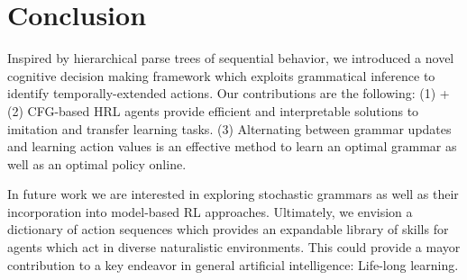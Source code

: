 \documentclass[10pt,letterpaper]{article}
\begin{document}
\section{Conclusion}

Inspired by hierarchical parse trees of sequential behavior, we introduced a novel cognitive decision making framework which exploits grammatical inference to identify temporally-extended actions.
Our contributions are the following:
%
(1) + (2) CFG-based HRL agents provide efficient and interpretable solutions to imitation and transfer learning tasks.
%
(3) Alternating between grammar updates and learning action values is an effective method to learn an optimal grammar as well as an optimal policy online.

In future work we are interested in exploring stochastic grammars as well as their incorporation into model-based RL approaches. Ultimately, we envision a dictionary of action sequences which provides an expandable library of skills for agents which act in diverse naturalistic environments. This could provide a mayor contribution to a key endeavor in general artificial intelligence: Life-long learning.

\newpage


\setlength{\bibleftmargin}{.125in}
\setlength{\bibindent}{-\bibleftmargin}


\end{document}
